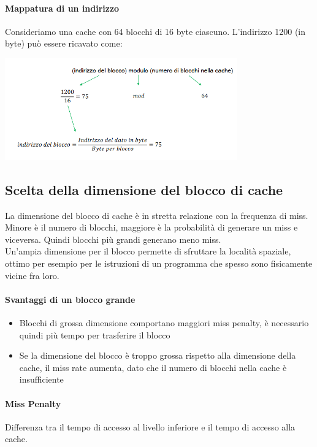 \documentclass[12pt, a4paper, openany]{book}
\begin{document}
\paragraph{Mappatura di un indirizzo} Consideriamo una cache con 64 blocchi di 16 byte ciascuno.
L'indirizzo 1200 (in byte) può essere ricavato come:
\begin{center}
    \includegraphics[width=100mm, scale=0.5]{mappatura indirizzo esempio.png}
\end{center}

\subsection*{Scelta della dimensione del blocco di cache}
La dimensione del blocco di cache è in stretta relazione con la frequenza di miss.
Minore è il numero di blocchi, maggiore è la probabilità di generare un miss e viceversa.
Quindi blocchi più grandi generano meno miss.
\\ Un'ampia dimensione per il blocco permette di sfruttare la località spaziale, ottimo per
esempio per le istruzioni di un programma che spesso sono fisicamente vicine fra loro.
\paragraph{Svantaggi di un blocco grande}
\begin{itemize}
    \item Blocchi di grossa dimensione comportano maggiori miss penalty, è necessario quindi
    più tempo per trasferire il blocco
    \item Se la dimensione del blocco è troppo grossa rispetto alla dimensione della cache,
    il miss rate aumenta, dato che il numero di blocchi nella cache è insufficiente
\end{itemize}
\paragraph{Miss Penalty} Differenza tra il tempo di accesso al livello inferiore e il tempo di
accesso alla cache.
\end{document}
